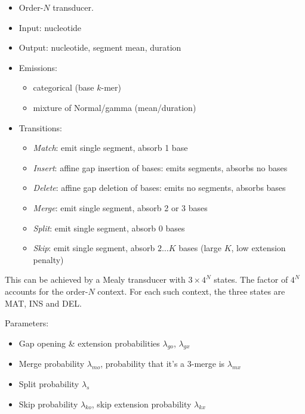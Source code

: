 \documentclass[10pt]{article}
\begin{document}
\begin{itemize}
\item Order-$N$ transducer.
\item Input: nucleotide
\item Output: nucleotide, segment mean, duration
\item Emissions:
 \begin{itemize}
 \item categorical (base $k$-mer)
 \item mixture of Normal/gamma (mean/duration)
 \end{itemize}
\item Transitions:
 \begin{itemize}
 \item {\em Match}: emit single segment, absorb 1 base
 \item {\em Insert}: affine gap insertion of bases: emits segments, absorbs no bases
 \item {\em Delete}: affine gap deletion of bases: emits no segments, absorbs bases
 \item {\em Merge}: emit single segment, absorb 2 or 3 bases
 \item {\em Split}: emit single segment, absorb 0 bases
 \item {\em Skip}: emit single segment, absorb $2 \ldots K$ bases (large $K$, low extension penalty)
 \end{itemize}
\end{itemize}

This can be achieved by a Mealy transducer with $3 \times 4^N$ states.
The factor of $4^N$ accounts for the order-$N$ context.
For each such context, the three states are MAT, INS and DEL.

\newcommand\pgapopen{\lambda_{go}}
\newcommand\pgapextend{\lambda_{gx}}
\newcommand\pmergeopen{\lambda_{mo}}
\newcommand\pmergeextend{\lambda_{mx}}
\newcommand\psplit{\lambda_s}
\newcommand\pskipopen{\lambda_{ko}}
\newcommand\pskipextend{\lambda_{kx}}

Parameters:
 \begin{itemize}
 \item Gap opening \& extension probabilities $\pgapopen$, $\pgapextend$
 \item Merge probability $\pmergeopen$, probability that it's a 3-merge is $\pmergeextend$
 \item Split probability $\psplit$
 \item Skip probability $\pskipopen$, skip extension probability $\pskipextend$
 \end{itemize}
\end{document}

